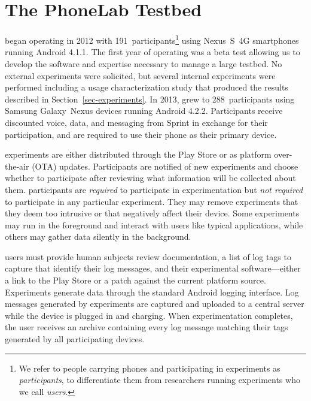 \section{The PhoneLab Testbed}
\label{sec-testbed}

\PhoneLab{} began operating in 2012 with 191~participants\footnote{\small We
refer to people carrying \PhoneLab{} phones and participating in experiments as
\PhoneLab{} \textit{participants}, to differentiate them from researchers
running \PhoneLab{} experiments who we call \textit{users}.} using Nexus~S~4G
smartphones running Android 4.1.1. The first
year of operating was a beta test allowing us to develop the software and
expertise necessary to manage a large testbed. No external experiments were
solicited, but several internal experiments were performed including a usage
characterization study that produced the results described in
Section~\ref{sec-experiments}. In 2013, \PhoneLab{} grew to 288~participants
using Samsung Galaxy~Nexus devices running Android 4.2.2. Participants receive
discounted voice, data, and messaging from Sprint in exchange for their
participation, and are required to use their \PhoneLab{} phone as their primary
device.

\PhoneLab{} experiments are either distributed through the Play Store or as
platform over-the-air (OTA) updates. Participants are notified of new
experiments and choose whether to participate after reviewing what
information will be collected about them. \PhoneLab{} participants are
\textit{required} to participate in experimentation but \textit{not required}
to participate in any particular experiment. They may remove experiments that
they deem too intrusive or that negatively affect their device. Some
experiments may run in the foreground and interact with users like typical
applications, while others may gather data silently in the background.

\PhoneLab{} users must provide human subjects review documentation, a list of
log tags to capture that identify their log messages, and their experimental
software---either a link to the Play Store or a patch against the current
\PhoneLab{} platform source. Experiments generate data through the standard
Android logging interface. Log messages generated by \PhoneLab{} experiments are
captured and uploaded to a central server while the device is plugged in and
charging. When experimentation completes, the user receives an archive
containing every log message matching their tags generated by all participating
devices.

